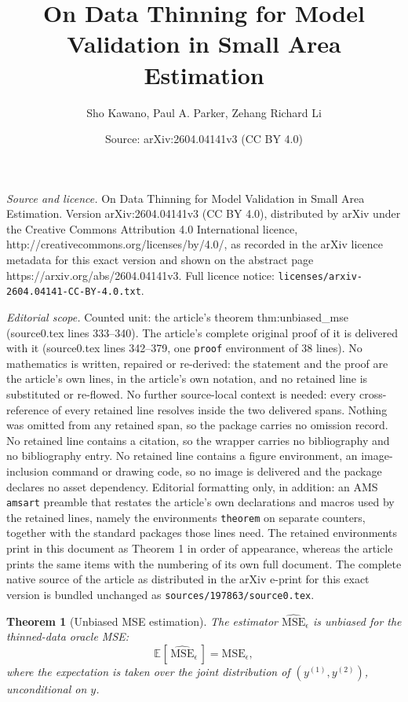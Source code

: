 \documentclass[10pt,a4paper]{amsart}
\title{On Data Thinning for Model Validation in Small Area Estimation}
\author{Sho Kawano, Paul A. Parker, Zehang Richard Li}
\date{Source: arXiv:2604.04141v3 (CC BY 4.0)}
\newtheorem{theorem}{Theorem}
\newcommand{\E}[2][]{\mathbb{E}_{#1}\!\left[\,#2\,\right]}
\newcommand{\msehat}{\widehat{\mathrm{MSE}}_{\epsilon}}
\newcommand{\msethin}{\mathrm{MSE}_{\epsilon}}
\begin{document}
\maketitle

\noindent\emph{Source and licence.} On Data Thinning for Model Validation in Small Area Estimation. Version arXiv:2604.04141v3 (CC BY 4.0), distributed by arXiv under the Creative Commons Attribution 4.0 International licence, http://creativecommons.org/licenses/by/4.0/, as recorded in the arXiv licence metadata for this exact version and shown on the abstract page https://arxiv.org/abs/2604.04141v3. Full licence notice: \texttt{licenses/arxiv-2604.04141-CC-BY-4.0.txt}.\par\smallskip

\noindent\textit{Editorial scope.} Counted unit: the article's theorem thm:unbiased\_mse (source0.tex lines 333--340). The article's complete original proof of it is delivered with it (source0.tex lines 342--379, one \texttt{proof} environment of 38 lines). No mathematics is written, repaired or re-derived: the statement and the proof are the article's own lines, in the article's own notation, and no retained line is substituted or re-flowed.  No further source-local context is needed: every cross-reference of every retained line resolves inside the two delivered spans.  Nothing was omitted from any retained span, so the package carries no omission record.  No retained line contains a citation, so the wrapper carries no bibliography and no bibliography entry.  No retained line contains a figure environment, an image-inclusion command or drawing code, so no image is delivered and the package declares no asset dependency.  Editorial formatting only, in addition: an AMS \texttt{amsart} preamble that restates the article's own declarations and macros used by the retained lines, namely the environments \texttt{theorem} on separate counters, together with the standard packages those lines need.  The retained environments print in this document as Theorem 1 in order of appearance, whereas the article prints the same items with the numbering of its own full document.  The complete native source of the article as distributed in the arXiv e-print for this exact version is bundled unchanged as \texttt{sources/197863/source0.tex}.
\begin{theorem}[Unbiased MSE estimation]
\label{thm:unbiased_mse}
The estimator $\msehat$ is unbiased for the thinned-data oracle MSE:
\[
\E{\msehat} = \msethin,
\]
where the expectation is taken over the joint distribution of $(y^{(1)}, y^{(2)})$, unconditional on $y$.
\end{theorem}
\end{document}
